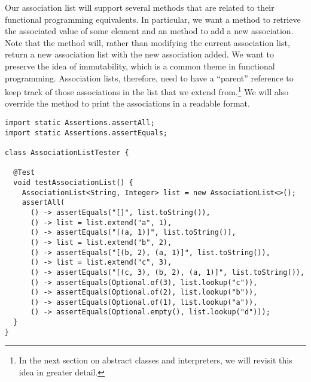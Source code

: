 Our association list will support several methods that are related to their functional programming equivalents. 
In particular, we want a  method to retrieve the associated value of some element and an  method to add a new association. 
Note that the  method will, rather than modifying the current association list, return a new association list with the new association added. 
We want to preserve the idea of immutability, which is a common theme in functional programming.
Association lists, therefore, need to have a ``parent'' reference to keep track of those associations in the list that we extend from.\footnote{In the next section on abstract classes and interpreters, we will revisit this idea in greater detail.} 
We will also override the  method to print the associations in a readable format. 

\begin{lstlisting}[language=MyJava]
import static Assertions.assertAll;
import static Assertions.assertEquals;

class AssociationListTester {

  @Test
  void testAssociationList() {
    AssociationList<String, Integer> list = new AssociationList<>();
    assertAll(
      () -> assertEquals("[]", list.toString()),
      () -> list = list.extend("a", 1),
      () -> assertEquals("[(a, 1)]", list.toString()),
      () -> list = list.extend("b", 2),
      () -> assertEquals("[(b, 2), (a, 1)]", list.toString()),
      () -> list = list.extend("c", 3),
      () -> assertEquals("[(c, 3), (b, 2), (a, 1)]", list.toString()),
      () -> assertEquals(Optional.of(3), list.lookup("c")),
      () -> assertEquals(Optional.of(2), list.lookup("b")),
      () -> assertEquals(Optional.of(1), list.lookup("a")),
      () -> assertEquals(Optional.empty(), list.lookup("d")));
  }
}
\end{lstlisting}

